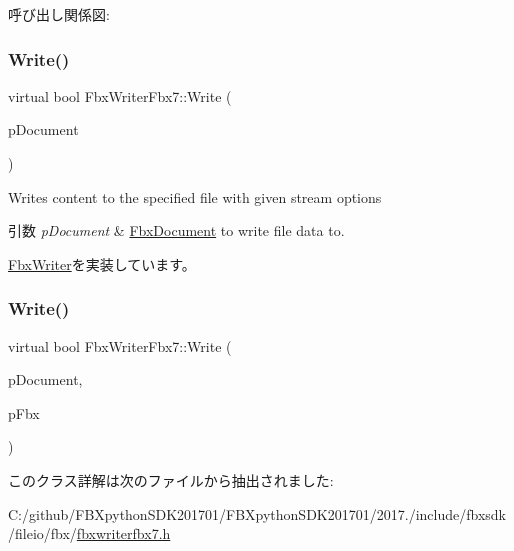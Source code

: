呼び出し関係図\+:
\mbox{\label{class_fbx_writer_fbx7_abc9fcf2cf7e1ed96f87bdc67f05f9545}} 
\subsubsection{\texorpdfstring{Write()}{Write()}\hspace{0.1cm}{\footnotesize\ttfamily [1/2]}}
{\footnotesize\ttfamily virtual bool Fbx\+Writer\+Fbx7\+::\+Write (\begin{DoxyParamCaption}\item[{\hyperlink{class_fbx_document}{Fbx\+Document} $\ast$}]{p\+Document }\end{DoxyParamCaption})\hspace{0.3cm}{\ttfamily [virtual]}}

Writes content to the specified file with given stream options 
\begin{DoxyParams}{引数}
{\em p\+Document} & \hyperlink{class_fbx_document}{Fbx\+Document} to write file data to. \\
\hline
\end{DoxyParams}


\hyperlink{class_fbx_writer_aa8c0277611da0fdb0b9a184c55c30c2c}{Fbx\+Writer}を実装しています。

\mbox{\label{class_fbx_writer_fbx7_a4e20df937a566f3b5eb68427808354f9}} 
\subsubsection{\texorpdfstring{Write()}{Write()}\hspace{0.1cm}{\footnotesize\ttfamily [2/2]}}
{\footnotesize\ttfamily virtual bool Fbx\+Writer\+Fbx7\+::\+Write (\begin{DoxyParamCaption}\item[{\hyperlink{class_fbx_document}{Fbx\+Document} $\ast$}]{p\+Document,  }\item[{\hyperlink{class_fbx_i_o}{Fbx\+IO} $\ast$}]{p\+Fbx }\end{DoxyParamCaption})\hspace{0.3cm}{\ttfamily [virtual]}}



このクラス詳解は次のファイルから抽出されました\+:\begin{DoxyCompactItemize}
\item 
C\+:/github/\+F\+B\+Xpython\+S\+D\+K201701/\+F\+B\+Xpython\+S\+D\+K201701/2017./include/fbxsdk/fileio/fbx/\hyperlink{fbxwriterfbx7_8h}{fbxwriterfbx7.\+h}\end{DoxyCompactItemize}

